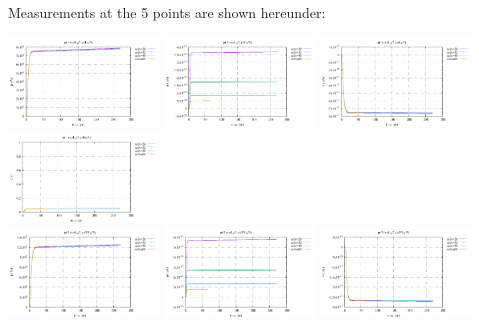 \newpage
Measurements at the 5 points are shown hereunder:
\begin{center}
\includegraphics[width=4cm]{python_codes/fieldstone_126/results/model1/pt1_p.pdf}
\includegraphics[width=4cm]{python_codes/fieldstone_126/results/model1/pt1_u.pdf}
\includegraphics[width=4cm]{python_codes/fieldstone_126/results/model1/pt1_v.pdf}
\includegraphics[width=4cm]{python_codes/fieldstone_126/results/model1/pt1_Ovp.pdf}\\
\includegraphics[width=4cm]{python_codes/fieldstone_126/results/model1/pt2_p.pdf}
\includegraphics[width=4cm]{python_codes/fieldstone_126/results/model1/pt2_u.pdf}
\includegraphics[width=4cm]{python_codes/fieldstone_126/results/model1/pt2_v.pdf}

\end{center}
